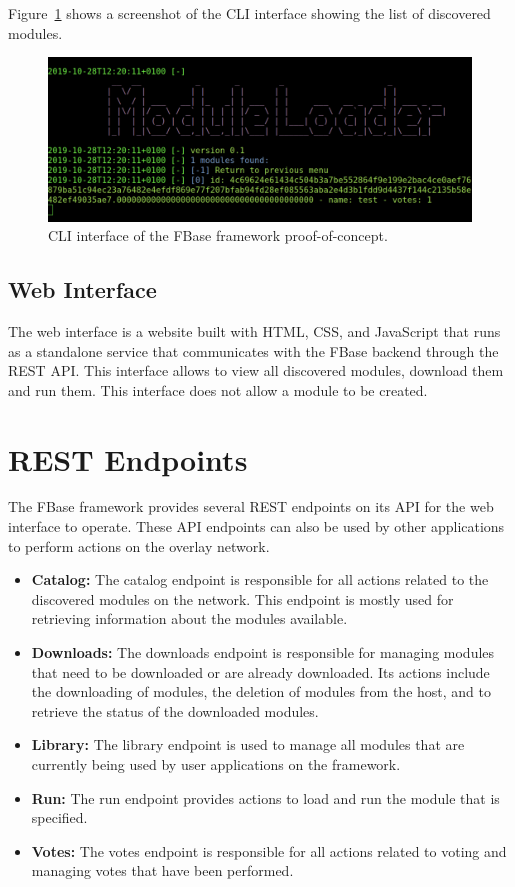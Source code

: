 Figure~\ref{fig:cli-interface} shows a screenshot of the CLI interface showing the list of discovered modules.

\begin{figure}[h!]
	\centering
	\includegraphics[width=\textwidth]{images/implementation-cli-interface.png}
	\caption{\label{fig:cli-interface} CLI interface of the FBase framework proof-of-concept.}
\end{figure}

\subsection{Web Interface}

The web interface is a website built with HTML, CSS, and JavaScript that runs as a standalone service that communicates with the FBase backend through the REST API. This interface allows to view all discovered modules, download them and run them. This interface does not allow a module to be created.

\section{REST Endpoints}

The FBase framework provides several REST endpoints on its API for the web interface to operate. These API endpoints can also be used by other applications to perform actions on the overlay network.

\begin{itemize}
	\item \textbf{Catalog:} The catalog endpoint is responsible for all actions related to the discovered modules on the network. This endpoint is mostly used for retrieving information about the modules available.
	\item \textbf{Downloads:} The downloads endpoint is responsible for managing modules that need to be downloaded or are already downloaded. Its actions include the downloading of modules, the deletion of modules from the host, and to retrieve the status of the downloaded modules.
	\item \textbf{Library:} The library endpoint is used to manage all modules that are currently being used by user applications on the framework.
	\item \textbf{Run:} The run endpoint provides actions to load and run the module that is specified.
	\item \textbf{Votes:} The votes endpoint is responsible for all actions related to voting and managing votes that have been performed.
\end{itemize}

